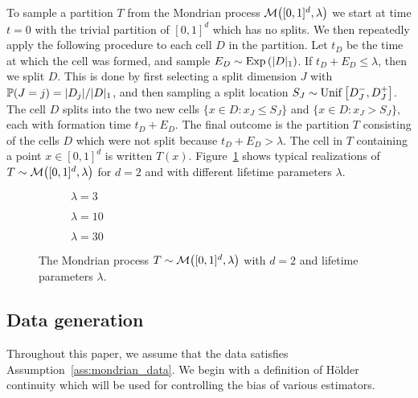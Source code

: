 To sample a partition $T$ from the Mondrian process
$\cM \big( [0,1]^d, \lambda \big)$
we start at time $t=0$ with the trivial partition
of $[0,1]^d$ which has no splits.
We then repeatedly apply the following procedure to each cell $D$
in the partition.
Let $t_D$ be the time at which the cell was formed,
and sample $E_D \sim \Exp \left( |D|_1 \right)$.
If $t_D + E_D \leq \lambda$, then we split $D$.
This is done by first selecting a split dimension $J$ with
$\P(J=j) = |D_j| / |D|_1$, and then sampling a split location
$S_J \sim \Unif\big[D_J^-, D_J^+\big]$.
The cell $D$ splits into the two new cells
$\{x \in D : x_J \leq S_J\}$ and $\{x \in D : x_J > S_J\}$,
each with formation time $t_D + E_D$.
The final outcome is the partition $T$ consisting of the cells $D$
which were not split because $t_D + E_D > \lambda$.
The cell in $T$ containing a point $x \in [0,1]^d$
is written $T(x)$.
Figure~\ref{fig:mondrian_process} shows typical realizations of
$T \sim \cM\big( [0,1]^d, \lambda \big)$ for
$d=2$ and with different lifetime parameters $\lambda$.
%
\begin{figure}[ht]
  \centering
  \begin{subfigure}{0.32\textwidth}
    \centering
    \resizebox{1.0\textwidth}{!}{
      
    }
    \caption{$\lambda = 3$}
  \end{subfigure}
  \begin{subfigure}{0.32\textwidth}
    \centering
    \resizebox{1.0\textwidth}{!}{
      
    }
    \caption{$\lambda = 10$}
  \end{subfigure}
  \begin{subfigure}{0.32\textwidth}
    \centering
    \resizebox{1.0\textwidth}{!}{
      
    }
    \caption{$\lambda = 30$}
  \end{subfigure}
  \caption{
    The Mondrian process
    $T \sim \cM \big( [0,1]^d, \lambda \big)$
    with $d=2$ and lifetime parameters $\lambda$.
  }
  \label{fig:mondrian_process}
\end{figure}

\subsection{Data generation}

Throughout this paper,
we assume that the data satisfies Assumption~\ref{ass:mondrian_data}.
We begin with a definition of H{\"o}lder continuity
which will be used for controlling the bias of various estimators.


